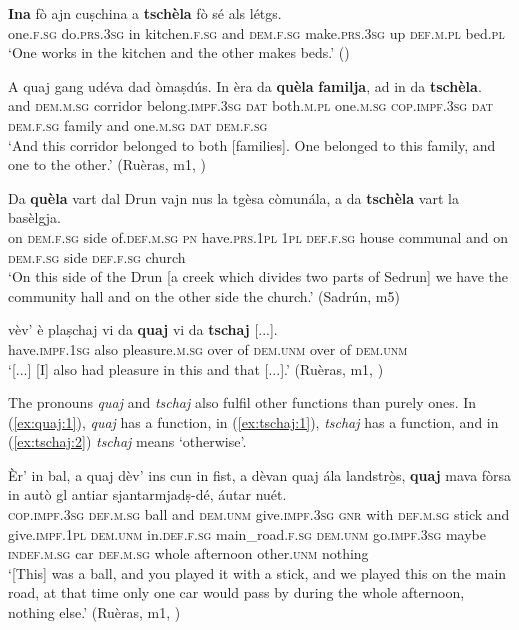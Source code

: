 \ea\label{ex:tschela1}
\gll \textbf{Ina} fò ajn cuṣchina a \textbf{tschèla} fò sé als létgs.\\
one.\textsc{f.sg} do.\textsc{prs.3sg} in kitchen.\textsc{f.sg} and \textsc{dem.f.sg} make.\textsc{prs.3sg} up \textsc{def.m.pl} bed.\textsc{pl}\\
\glt `One works in the kitchen and the other makes beds.' ()
\z

\ea\label{ex:tschela2}
\gll    A quaj gang udéva dad òmaṣdús.  In èra da \textbf{quèla} \textbf{familja}, ad in da \textbf{tschèla}.\\
and \textsc{dem.m.sg} corridor belong.\textsc{impf.3sg} \textsc{dat}  both.\textsc{m.pl} one.\textsc{m.sg} \textsc{cop.impf.3sg} \textsc{dat}  \textsc{dem.f.sg} family and one.\textsc{m.sg} \textsc{dat} \textsc{dem.f.sg}\\
\glt `And this corridor belonged to both [families]. One belonged to this family, and one to the other.' (Ruèras, m1, )
\z

\ea\label{ex:tschela3}
\gll Da \textbf{quèla} vart dal Drun vajn nus la tgèsa còmunála, a da \textbf{tschèla} vart la basèlgja.\\
on \textsc{dem.f.sg} side of.\textsc{def.m.sg} \textsc{pn} have.\textsc{prs.1pl} \textsc{1pl} \textsc{def.f.sg} house communal and on \textsc{dem.f.sg} side \textsc{def.f.sg} church\\
\glt`On this side of the Drun [a creek which divides two parts of Sedrun] we have the community hall and on the other side the church.' (Sadrún, m5)
\z

\ea\label{ex:tschela4}
\gll [...] vèv' è plaṣchaj vi da \textbf{quaj} vi da \textbf{tschaj} [...].\\
{} have.\textsc{impf.1sg} also pleasure.\textsc{m.sg} over of \textsc{dem.unm} over of \textsc{dem.unm}\\
\glt `[...] [I] also had pleasure in this and that [...].' (Ruèras, m1, )
\z

The  pronouns \textit{quaj} and \textit{tschaj}  also fulfil other functions than purely  ones. In (\ref{ex:quaj:1}), \textit{quaj} has a  function, in (\ref{ex:tschaj:1}), \textit{tschaj} has a  function, and in (\ref{ex:tschaj:2}) \textit{tschaj} means `otherwise'.

\ea\label{ex:quaj:1}
\gll    Èr’ in bal, a quaj dèv’ ins cun in fist, a dèvan quaj ála  landstr{\`o̱}s, \textbf{quaj} mava fòrsa in autò gl antiar sjantarmjadṣ-dé, áutar nuét.\\
\textsc{cop.impf.3sg} \textsc{def.m.sg} ball and \textsc{dem.unm} give.\textsc{impf.3sg} \textsc{gnr} with \textsc{def.m.sg} stick and give.\textsc{impf.1pl} \textsc{dem.unm} in.\textsc{def.f.sg} main\_road.\textsc{f.sg} \textsc{dem.unm} go.\textsc{impf.3sg} maybe \textsc{indef.m.sg} car \textsc{def.m.sg} whole afternoon other.\textsc{unm} nothing\\
\glt `[This] was a ball, and you played it with a stick, and we played this on the main road, at that time only one car would pass by during the whole afternoon, nothing else.' (Ruèras, m1, )
\z

